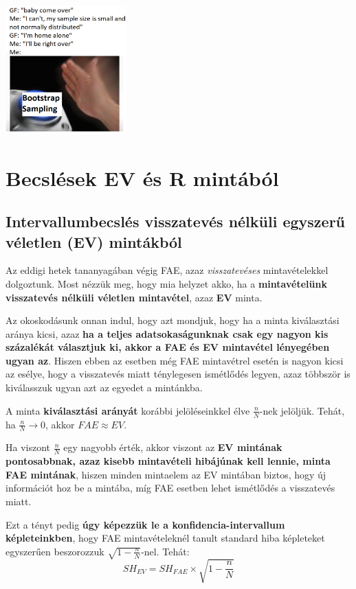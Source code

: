 \documentclass[
]{book}
\begin{document}
\includegraphics[width=0.35\textwidth,height=\textheight]{BootstrapMeme.png}

\chapter{Becslések EV és R mintából}\label{becsluxe9sek-ev-uxe9s-r-mintuxe1buxf3l}

\section{Intervallumbecslés visszatevés nélküli egyszerű véletlen (EV) mintákból}\label{intervallumbecsluxe9s-visszatevuxe9s-nuxe9lkuxfcli-egyszerux171-vuxe9letlen-ev-mintuxe1kbuxf3l}

Az eddigi hetek tananyagában végig FAE, azaz \emph{visszatevéses} mintavételekkel dolgoztunk. Most nézzük meg, hogy mia helyzet akko, ha a \textbf{mintavételünk visszatevés nélküli véletlen mintavétel}, azaz \textbf{EV} minta.

Az okoskodásunk onnan indul, hogy azt mondjuk, hogy ha a minta kiválasztási aránya kicsi, azaz \textbf{ha a teljes adatsokaságunknak csak egy nagyon kis százalékát választjuk ki, akkor a FAE és EV mintavétel lényegében ugyan az}. Hiszen ebben az esetben még FAE mintavétrel esetén is nagyon kicsi az esélye, hogy a visszatevés miatt ténylegesen ismétlődés legyen, azaz többször is kiválasszuk ugyan azt az egyedet a mintánkba.

A minta \textbf{kiválasztási arányát} korábbi jelöléseinkkel élve \(\frac{n}{N}\)-nek jelöljük. Tehát, ha \(\frac{n}{N} \rightarrow 0\), akkor \(FAE \approx EV\).

Ha viszont \(\frac{n}{N}\) egy nagyobb érték, akkor viszont az \textbf{EV mintának pontosabbnak, azaz kisebb mintavételi hibájúnak kell lennie, minta FAE mintának}, hiszen minden mintaelem az EV mintában biztos, hogy új információt hoz be a mintába, míg FAE esetben lehet ismétlődés a visszatevés miatt.

Ezt a tényt pedig \textbf{úgy képezzük le a konfidencia-intervallum képleteinkben}, hogy FAE mintavételeknél tanult standard hiba képleteket egyszerűen beszorozzuk \(\sqrt{1-\frac{n}{N}}\)-nel. Tehát: \[SH_{EV}=SH_{FAE} \times \sqrt{1-\frac{n}{N}}\]
\end{document}
